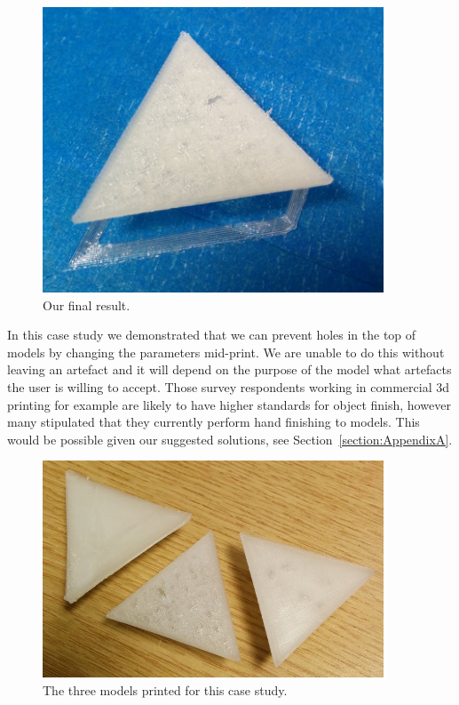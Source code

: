 \documentclass[11pt]{report} %
\begin{document}
\begin{figure}[H]
  \centering
  \includegraphics[width=4in]{PyramidOld1.png}
  \caption{Our final result.}
  \label{figure:PyramidNew2}
\end{figure}

In this case study we demonstrated that we can prevent holes in the top of models by changing the parameters mid-print. We are unable to do this without leaving an artefact and it will depend on the purpose of the model what artefacts the user is willing to accept. Those survey respondents working in commercial 3d printing for example are likely to have higher standards for object finish, however many stipulated that they currently perform hand finishing to models. This would be possible given our suggested solutions, see Section~\ref{section:AppendixA}.

\begin{figure}[H]
  \centering
  \includegraphics[width=4in]{PyramidsAll.png}
  \caption{The three models printed for this case study.}
  \label{figure:PyramidsAll}
\end{figure}
\end{document}
